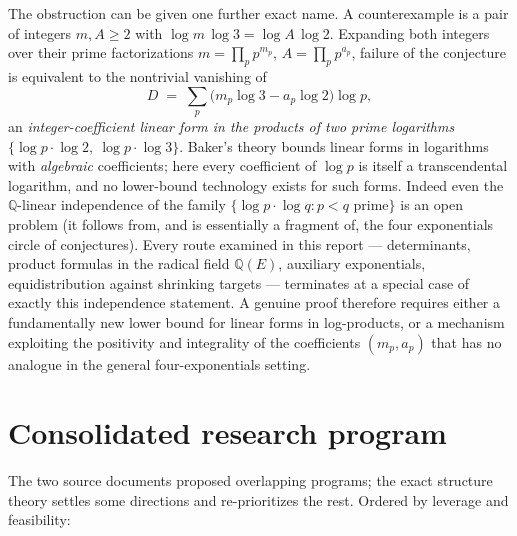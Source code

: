 \documentclass[11pt,oneside]{article}
\theoremstyle{definition}
\theoremstyle{remark}
\newcommand{\Q}{\mathbb Q}
\begin{document}
The obstruction can be given one further exact name.  A counterexample is a pair of
integers $m,A\ge2$ with $\log m\,\log3=\log A\,\log2$.  Expanding both integers over their
prime factorizations $m=\prod_pp^{m_p}$, $A=\prod_pp^{a_p}$, failure of the conjecture is
equivalent to the nontrivial vanishing of
\[
  D \;=\; \sum_{p}\bigl(m_p\log 3-a_p\log 2\bigr)\log p ,
\]
an \emph{integer-coefficient linear form in the products of two prime logarithms}
$\{\log p\cdot\log2,\ \log p\cdot\log3\}$.  Baker's theory bounds linear forms in
logarithms with \emph{algebraic} coefficients; here every coefficient of $\log p$ is itself
a transcendental logarithm, and no lower-bound technology exists for such forms.  Indeed
even the $\Q$-linear independence of the family $\{\log p\cdot\log q:p<q\text{ prime}\}$ is
an open problem (it follows from, and is essentially a fragment of, the four exponentials
circle of conjectures).  Every route examined in this report --- determinants, product
formulas in the radical field $\Q(E)$, auxiliary exponentials, equidistribution against
shrinking targets --- terminates at a special case of exactly this independence statement.
A genuine proof therefore requires either a fundamentally new lower bound for linear forms
in log-products, or a mechanism exploiting the positivity and integrality of the
coefficients $(m_p,a_p)$ that has no analogue in the general four-exponentials setting.

\section{Consolidated research program}
\label{sec:program}

The two source documents proposed overlapping programs; the exact structure theory settles
some directions and re-prioritizes the rest.  Ordered by leverage and feasibility:
\end{document}
